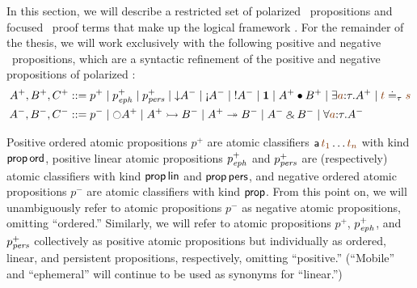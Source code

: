 In this section, we will describe a restricted set of polarized
\ollll~propositions and focused \ollll~proof terms that make up the
logical framework \sls. For the remainder of the thesis, we will work
exclusively with the following positive and negative
\sls~propositions, which are a syntactic refinement of the positive
and negative propositions of polarized \ollll:
\begin{align*}
A^+, B^+, C^+ & ::= p^+ \mid p^+_\meph \mid p^+_\mpers \mid {\downarrow}A^-
  \mid {\gnab}A^- \mid {!}A^- \mid \one \mid A^+ \fuse B^+
  \mid \exists \lf{a}{:}\tau.A^+ \mid \lf{t} \doteq_\tau \lf{s}
\\
A^-, B^-, C^- & ::= p^- \mid {\ocircle}A^+ \mid A^+ \lefti B^- 
  \mid A^+ \righti B^- \mid A^- \with B^-
  \mid \forall \lf{a}{:}\tau.A^-
\end{align*}


Positive ordered atomic propositions
$p^+$ are atomic classifiers ${\sf a}\,\lf{t_1}\ldots\lf{t_n}$ with
kind ${\sf prop}\,{\sf ord}$, positive linear atomic propositions
$p^+_{\it eph}$ and $p^+_{\it pers}$ are (respectively) atomic classifiers
with kind ${\sf prop}\,{\sf lin}$ and ${\sf prop}\,{\sf pers}$, and
negative ordered atomic propositions $p^-$ are atomic classifiers
with kind ${\sf prop}$.  From this point on,
we will unambiguously refer to atomic propositions $p^-$ as negative
atomic propositions, omitting ``ordered.'' Similarly, we will refer to
atomic propositions $p^+$, $p^+_{\it eph}$, and $p^+_{\it pers}$ collectively
as positive atomic propositions but individually as ordered, linear,
and persistent propositions, respectively, omitting ``positive.''
(``Mobile'' and ``ephemeral'' will continue to be used as synonyms for
``linear.'')


